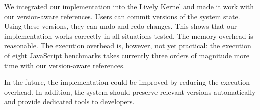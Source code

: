 We integrated our implementation into the Lively Kernel and made it work with our version-aware references.
Users can commit versions of the system state.
Using these versions, they can undo and redo changes.
This shows that our implementation works correctly in all situations tested.
The memory overhead is reasonable.
The execution overhead is, however, not yet practical: the execution of eight JavaScript benchmarks takes currently three orders of magnitude more time with our version-aware references.

In the future, the implementation could be improved by reducing the execution overhead.
In addition, the system should preserve relevant versions automatically and provide dedicated tools to developers.
